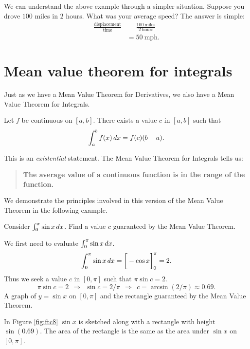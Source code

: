 \documentclass{ximera}
\begin{document}
We can understand the above example through a simpler
situation. Suppose you drove $100$ miles in $2$ hours. What was your
average speed? The answer is simple:
\begin{align*}
  \frac{\text{displacement}}{\text{time}} &= \frac{100~\text{miles}}{2~\text{hours}}\\
  &= 50~\text{mph.}
\end{align*}






\section{Mean value theorem for integrals}

Just as we have a Mean Value Theorem for Derivatives, we also have a
Mean Value Theorem for Integrals.


\begin{theorem}
Let $f$ be continuous on $[a,b]$. There exists a value $c$ in $[a,b]$
such that
\[
\int_a^bf(x)\,d x = f(c)(b-a).
\]
\end{theorem}

This is an \emph{existential} statement. The Mean Value Theorem for
Integrals tells us:
\begin{quote}
\textbf{The average value of a continuous function is in the range of
  the function.}
\end{quote}


We demonstrate the principles involved in this version of the Mean
Value Theorem in the following example.

\begin{example}%
  Consider $\int_0^\pi \sin x \,d x$. Find a value $c$ guaranteed by the Mean Value Theorem.
  \begin{explanation}
    We first need to evaluate $\int_0^\pi \sin x\,d x$.
    \[
    \int_0^\pi\sin x\,d x =\bigg[ -\cos x \bigg]_0^\pi = 2.
    \]
    Thus we seek a value $c$ in $[0,\pi]$ such that $\pi\sin c =2$. 
    \[
    \pi\sin c = 2\ \ \Rightarrow\ \ \sin c = 2/\pi\ \ \Rightarrow\ \ c = \arcsin(2/\pi) \approx 0.69.
    \]
    A graph of $y=\sin x$ on $[0,\pi]$ and the rectangle guaranteed by the Mean Value Theorem.
  \end{explanation}
\end{example}
In Figure \ref{fig:ftc8} $\sin x$ is sketched along with a rectangle
with height $\sin (0.69)$. The area of the rectangle is the same as
the area under $\sin x$ on $[0,\pi]$. 
\end{document}
